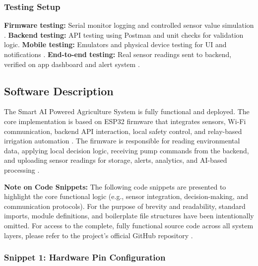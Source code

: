 \subsubsection{Testing Setup}
\textbf{Firmware testing:} Serial monitor logging and controlled sensor value simulation \cite{hassebo2024esp32}. \textbf{Backend testing:} API testing using Postman and unit checks for validation logic. \textbf{Mobile testing:} Emulators and physical device testing for UI and notifications \cite{khawas2018firebase}. \textbf{End-to-end testing:} Real sensor readings sent to backend, verified on app dashboard and alert system \cite{emon2025iot}.


\subsection{Software Description}
\label{sec:software-description}

The Smart AI Powered Agriculture System is fully functional and 
deployed. The core implementation is based on ESP32 firmware that 
integrates sensors, Wi-Fi communication, backend API interaction, 
local safety control, and relay-based irrigation automation 
\cite{hassebo2024esp32}. The firmware is responsible for reading 
environmental data, applying local decision logic, receiving pump 
commands from the backend, and uploading sensor readings for 
storage, alerts, analytics, and AI-based processing 
\cite{thilakarathne2023fields}.

\vspace{0.5em}
\noindent\textbf{Note on Code Snippets:} The following code snippets are presented to highlight the core functional logic (e.g., sensor integration, decision-making, and communication protocols). For the purpose of brevity and readability, standard imports, module definitions, and boilerplate file structures have been intentionally omitted. For access to the complete, fully functional source code across all system layers, please refer to the project's official GitHub repository \cite{smart_agri_github}.

\subsubsection{Snippet 1: Hardware Pin Configuration}
\label{subsec:snippet1}

